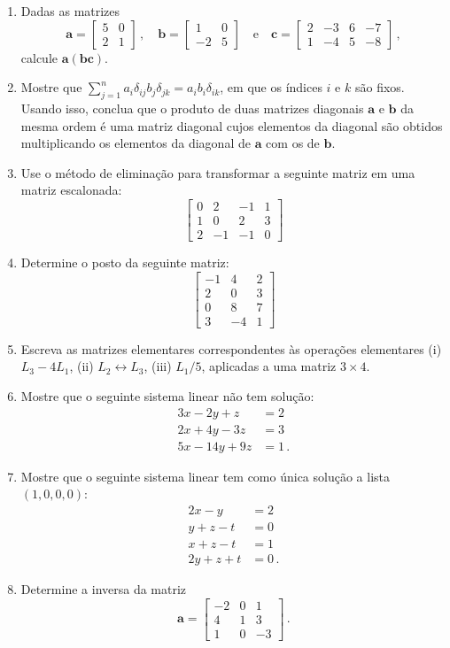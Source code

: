 \documentclass[12pt,a4paper]{article}
\newcommand{\mb}{\mathbf}
\begin{document}
\begin{enumerate}
  \item Dadas as matrizes
  $$\mb a=\begin{bmatrix}
    5&0\\
    2&1
  \end{bmatrix}\,,\quad \mb b=\begin{bmatrix}
    1&0\\
    -2&5
  \end{bmatrix}\quad\text{e}\quad \mb c=\begin{bmatrix}
    2&-3&6&-7\\
    1&-4&5&-8
  \end{bmatrix}\,,$$
  calcule $\mb a(\mb{bc})$.
  \item Mostre que $\sum_{j=1}^na_i\delta_{ij}b_j\delta_{jk}=a_ib_i\delta_{ik}$, em que os índices $i$ e $k$ são fixos. Usando isso, conclua que o produto de duas matrizes diagonais $\mb a$ e $\mb b$ da mesma ordem é uma matriz diagonal cujos elementos da diagonal são obtidos multiplicando os elementos da diagonal de $\mb a$ com os de $\mb b$.
  \item Use o método de eliminação para transformar a seguinte matriz em uma matriz escalonada:
  $$\begin{bmatrix}
    0&2&-1&1\\
    1&0&2&3\\
    2&-1&-1&0
  \end{bmatrix}$$
  \item Determine o posto da seguinte matriz:
  $$\begin{bmatrix}
    -1&4&2\\
    2&0&3\\
    0&8&7\\
    3&-4&1
  \end{bmatrix}$$
  \item Escreva as matrizes elementares correspondentes às operações elementares (i) $L_3-4L_1$, (ii) $L_2\leftrightarrow L_3$, (iii) $L_1/5$, aplicadas a uma matriz $3\times 4$.
  \item Mostre que o seguinte sistema linear não tem solução:
  \begin{equation*}
    \begin{split}
      3x-2y+z&=2\\
      2x+4y-3z&=3\\
      5x-14y+9z&=1\,.
    \end{split}
  \end{equation*}
  \item Mostre que o seguinte sistema linear tem como única solução a lista $(1,0,0,0)$:
  \begin{equation*}
    \begin{split}
      2x-y&=2\\
      y+z-t&=0\\
      x+z-t&=1\\
      2y+z+t&=0\,.
    \end{split}
  \end{equation*}
  \item Determine a inversa da matriz
  $$\mb a=\begin{bmatrix}
    -2&0&1\\
    4&1&3\\
    1&0&-3
  \end{bmatrix}\,.$$
\end{enumerate}
\end{document}
